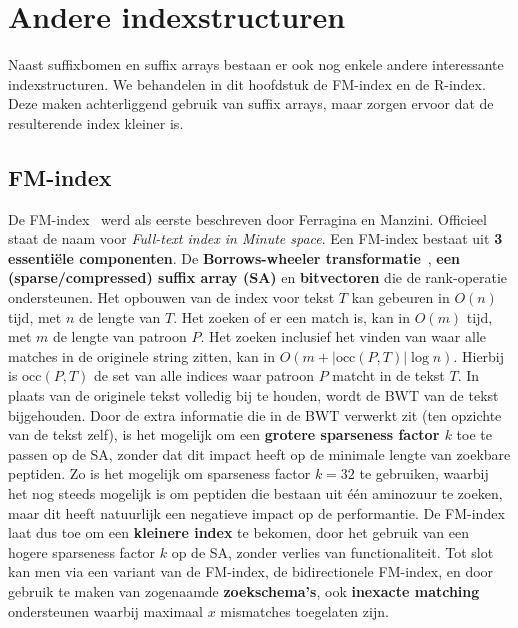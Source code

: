 \chapter{Andere indexstructuren}\label{ch:andere-indices}
Naast suffixbomen en suffix arrays bestaan er ook nog enkele andere interessante indexstructuren.
We behandelen in dit hoofdstuk de FM-index en de R-index.
Deze maken achterliggend gebruik van suffix arrays, maar zorgen ervoor dat de resulterende index kleiner is.


\section{FM-index}\label{sec:fm-index}
De FM-index~\cite{fm_index} werd als eerste beschreven door Ferragina en Manzini.
Officieel staat de naam voor \textit{Full-text index in Minute space}.
Een FM-index bestaat uit \textbf{3 essentiële componenten}.
De \textbf{Borrows-wheeler transformatie}~\cite{bwt}, \textbf{een (sparse/compressed) suffix array (SA)} en \textbf{bitvectoren} die de rank-operatie ondersteunen.
Het opbouwen van de index voor tekst $T$ kan gebeuren in $O(n)$ tijd, met $n$ de lengte van $T$.
Het zoeken of er een match is, kan in $O(m)$ tijd, met $m$ de lengte van patroon $P$.
Het zoeken inclusief het vinden van waar alle matches in de originele string zitten, kan in $O(m + \text{|occ}(P, T)\text{|} \log n)$.
Hierbij is $\text{occ}(P, T)$ de set van alle indices waar patroon $P$ matcht in de tekst $T$.
In plaats van de originele tekst volledig bij te houden, wordt de BWT van de tekst bijgehouden.
Door de extra informatie die in de BWT verwerkt zit (ten opzichte van de tekst zelf), is het mogelijk om een \textbf{grotere sparseness factor $k$} toe te passen op de SA, zonder dat dit impact heeft op de minimale lengte van zoekbare peptiden.
Zo is het mogelijk om sparseness factor $k = 32$ te gebruiken, waarbij het nog steeds mogelijk is om peptiden die bestaan uit één aminozuur te zoeken, maar dit heeft natuurlijk een negatieve impact op de performantie.
De FM-index laat dus toe om een \textbf{kleinere index} te bekomen, door het gebruik van een hogere sparseness factor $k$ op de SA, zonder verlies van functionaliteit.
Tot slot kan men via een variant van de FM-index, de bidirectionele FM-index, en door gebruik te maken van zogenaamde \textbf{zoekschema's}, ook \textbf{inexacte matching} ondersteunen waarbij maximaal $x$ mismatches toegelaten zijn.

